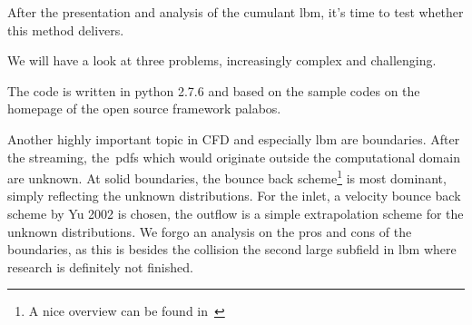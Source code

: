 After the presentation and analysis of the cumulant \gls{lbm}, it's time to test whether this method delivers.

We will have a look at three problems, increasingly complex and challenging.

The code is written in python 2.7.6 and based on the sample codes on the homepage of the open source framework palabos.

Another highly important topic in CFD and especially \gls{lbm} are boundaries.
After the streaming, the~\glspl{pdf} which would originate outside the computational domain are unknown.
At solid boundaries, the bounce back scheme\footnote{A nice overview can be found in~\cite{boundaries}} is most dominant, simply reflecting the unknown distributions.
For the inlet, a velocity bounce back scheme by Yu 2002
is chosen, the outflow is a simple extrapolation scheme for the unknown distributions.
We forgo an analysis on the pros and cons of the boundaries, as this is besides the collision the second large subfield in \gls{lbm} where research is definitely not finished.

